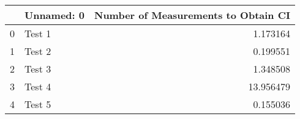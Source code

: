 \begin{tabular}{llr}
\toprule
{} & Unnamed: 0 &  Number of Measurements to Obtain CI \\
\midrule
0 &     Test 1 &                             1.173164 \\
1 &     Test 2 &                             0.199551 \\
2 &     Test 3 &                             1.348508 \\
3 &     Test 4 &                            13.956479 \\
4 &     Test 5 &                             0.155036 \\
\bottomrule
\end{tabular}
